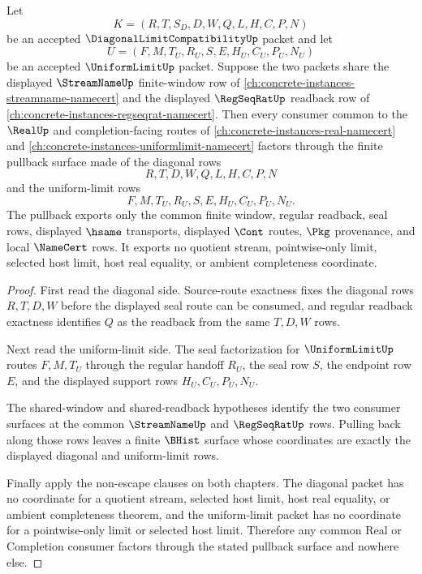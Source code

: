 \begin{theorem}
\label{thm:diagonal-limit-compatibility-uniform-window-real-seal-pullback}
Let
$$
K=(R,T,S_D,D,W,Q,L,H,C,P,N)
$$
be an accepted $\DiagonalLimitCompatibilityUp$ packet and let
$$
U=(F,M,T_U,R_U,S,E,H_U,C_U,P_U,N_U)
$$
be an accepted $\UniformLimitUp$ packet. Suppose the two packets share the displayed $\StreamNameUp$ finite-window row of \autoref{ch:concrete-instances-streamname-namecert} and the displayed $\RegSeqRatUp$ readback row of \autoref{ch:concrete-instances-regseqrat-namecert}. Then every consumer common to the $\RealUp$ and completion-facing routes of \autoref{ch:concrete-instances-real-namecert} and \autoref{ch:concrete-instances-uniformlimit-namecert} factors through the finite pullback surface made of the diagonal rows
$$
R,T,D,W,Q,L,H,C,P,N
$$
and the uniform-limit rows
$$
F,M,T_U,R_U,S,E,H_U,C_U,P_U,N_U.
$$
The pullback exports only the common finite window, regular readback, seal rows, displayed $\hsame$ transports, displayed $\Cont$ routes, $\Pkg$ provenance, and local $\NameCert$ rows. It exports no quotient stream, pointwise-only limit, selected host limit, host real equality, or ambient completeness coordinate.
\end{theorem}
\begin{proof}
First read the diagonal side. Source-route exactness fixes the diagonal rows $R,T,D,W$ before the displayed seal route can be consumed, and regular readback exactness identifies $Q$ as the readback from the same $T,D,W$ rows.

Next read the uniform-limit side. The seal factorization for $\UniformLimitUp$ routes $F,M,T_U$ through the regular handoff $R_U$, the seal row $S$, the endpoint row $E$, and the displayed support rows $H_U,C_U,P_U,N_U$.

The shared-window and shared-readback hypotheses identify the two consumer surfaces at the common $\StreamNameUp$ and $\RegSeqRatUp$ rows. Pulling back along those rows leaves a finite $\BHist$ surface whose coordinates are exactly the displayed diagonal and uniform-limit rows.

Finally apply the non-escape clauses on both chapters. The diagonal packet has no coordinate for a quotient stream, selected host limit, host real equality, or ambient completeness theorem, and the uniform-limit packet has no coordinate for a pointwise-only limit or selected host limit. Therefore any common Real or Completion consumer factors through the stated pullback surface and nowhere else.
\end{proof}

